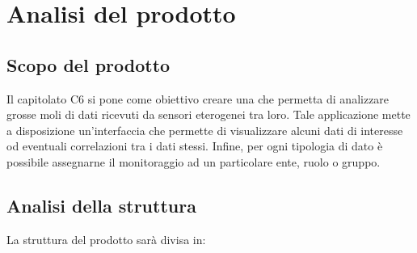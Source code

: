 \section{Analisi del prodotto}
	\subsection{Scopo del prodotto}
		Il capitolato C6 si pone come obiettivo creare una  che permetta di analizzare grosse moli di dati ricevuti da sensori eterogenei tra loro. Tale applicazione mette a disposizione un'interfaccia che permette di visualizzare alcuni dati di interesse od eventuali correlazioni tra i dati stessi. Infine, per ogni tipologia di dato è possibile assegnarne il monitoraggio ad un particolare ente, ruolo o gruppo.

	\subsection{Analisi della struttura}
		La struttura del prodotto sarà divisa in:
